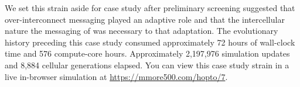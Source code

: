 We set this strain aside for case study after preliminary screening suggested that over-interconnect messaging played an adaptive role and that the intercellular nature the messaging of was necessary to that adaptation.
The evolutionary history preceding this case study consumed approximately 72 hours of wall-clock time and 576 compute-core hours.
Approximately 2,197,976 simulation updates and 8,884 cellular generations elapsed.
You can view this case study strain in a live in-browser simulation at \url{https://mmore500.com/hopto/7}.

